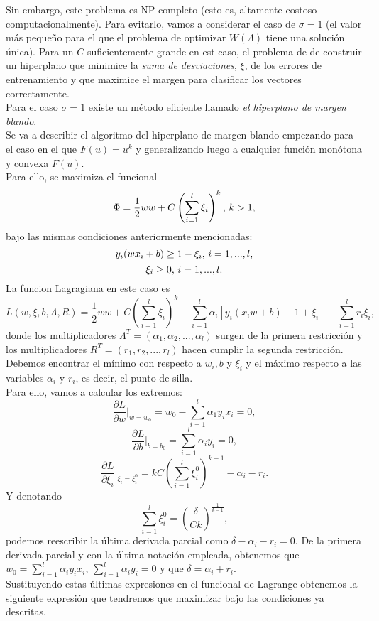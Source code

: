 Sin embargo, este problema es NP-completo (esto es, altamente costoso computacionalmente). Para evitarlo, vamos a considerar el caso de $\sigma=1$ (el valor más pequeño para el que el problema de optimizar $W(\Lambda)$ tiene una solución única). Para un $C$ suficientemente grande en est caso, el problema de de construir un hiperplano que minimice la \textit{suma de desviaciones}, $\xi$, de los errores de entrenamiento y que maximice el margen para clasificar los vectores correctamente.\\
Para el caso $\sigma=1$ existe un método eficiente llamado \textit{el hiperplano de margen blando}.\cite{cortes1995support}\\
Se va a describir el algoritmo del hiperplano de margen blando empezando para el caso en el que $F(u)=u^k$ y generalizando luego a cualquier función monótona y convexa $F(u)$.\\
Para ello, se maximiza el funcional
\[ \Phi = \frac{1}{2}ww+C \left( \sum_{i=1}^l \xi_i \right)^k \textnormal{,  } k>1, \]
bajo las mismas condiciones anteriormente mencionadas:
\[ y_i(wx_i+b) \geq 1-\xi_i \textnormal{, } i=1,...,l, \]
\[ \xi_i \geq 0 \textnormal{, } i=1,...,l. \]
La funcion Lagragiana en este caso es
\[ L(w,\xi,b,\Lambda,R)=\frac{1}{2}ww + C \left( \sum_{i=1}^l \xi_i \right)^k - \sum_{i=1}^l \alpha_i[y_i(x_iw + b) - 1 + \xi_i] - \sum_{i=1}^l r_i\xi_i, \]
donde los multiplicadores $\Lambda^T=(\alpha_1,\alpha_2,...,\alpha_l)$ surgen de la primera restricción y los multiplicadores $R^T=(r_1,r_2,...,r_l)$ hacen cumplir la segunda restricción.\\
Debemos encontrar el mínimo con respecto a $w_i,b$ y $\xi_i$ y el máximo respecto a las variables $\alpha_i$ y $r_i$, es decir, el punto de silla.\\
Para ello, vamos a calcular los extremos:\\
\[ \frac{\partial L}{\partial w}\Big|_{w=w_0} = w_0 - \sum_{i=1}^l \alpha_1 y_i x_i =0, \]
\[ \frac{\partial L}{\partial b} \Big|_{b=b_0} = \sum_{i=1}^l \alpha_i y_i =0, \]
\[ \frac{\partial L }{\partial \xi_i}\Big|_{\xi_i= \xi_i^0}=kC \left( \sum_{i=1}^l \xi_i^0 \right)^{k-1} - \alpha_i -r_i. \]
Y denotando
\[ \sum_{i=1}^l \xi_i^0 = \left( \frac{\delta}{Ck} \right)^{\frac{1}{k-1}}, \]
podemos reescribir la última derivada parcial como $\delta-\alpha_i-r_i=0.$ De la primera derivada parcial y con la última notación empleada, obtenemos que $w_0=\sum_{i=1}^l \alpha_iy_ix_i$, $\sum_{i=1}^l \alpha_iy_i=0$ y que $\delta=\alpha_i+r_i$.\\
Sustituyendo estas últimas expresiones en el funcional de Lagrange obtenemos la siguiente expresión que tendremos que maximizar bajo las condiciones ya descritas.
